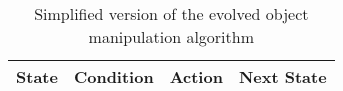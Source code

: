 \documentclass[10pt]{report}
\begin{document}
\begin{table}[ht]
\centering
\caption{Simplified version of the evolved object manipulation algorithm}
\begin{tabular}{|c|c|l|c|}
  \hline
  State & Condition & Action & Next State \\
  \hline
  
  \hline
\end{tabular}
\label{tab:ManipulationAlgorithm}
\end{table}
\end{document}
